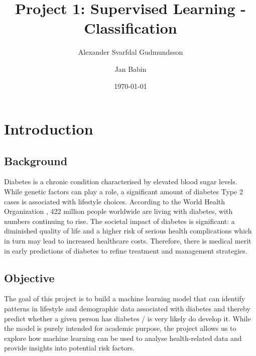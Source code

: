 \documentclass[a4paper,12pt]{article}
\title{Project 1: Supervised Learning - Classification}
\author{Alexander Svarfdal Gudmundsson \and Jan Babin}
\date{\today}
\begin{document}
\maketitle

\section{Introduction}
\subsection{Background}
Diabetes is a chronic condition characterised by elevated blood sugar levels. While genetic factors 
can play a role, a significant amount of diabetes Type 2 cases is associated with lifestyle choices. 
According to the World Health Organization \cite{WHO2016}, 422 million people worldwide 
are living with diabetes, with numbers continuing to rise. The societal impact of diabetes is 
significant: a diminished quality of life and a higher risk of serious health complications which in 
turn may lead to increased healthcare costs. Therefore, there is medical merit in
early predictions of diabetes to refine treatment and management strategies.

\subsection{Objective}
The goal of this project is to build a machine learning model that can identify 
patterns in lifestyle and demographic data associated with diabetes and thereby predict whether
a given person has diabetes / is very likely do develop it. While the 
model is purely intended for academic purpose, the project allows us to 
explore how machine learning can be used to analyse health-related data and 
provide insights into potential risk factors.
\end{document}
